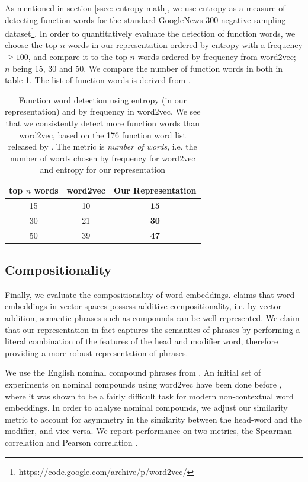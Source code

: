 \documentclass[11pt]{book}
\newcommand{\citep}[1]{\cite{#1}}
\newcommand{\citet}[1]{\cite{#1}}
\begin{document}
As mentioned in section \ref{ssec: entropy math}, we use entropy as a measure
of detecting function words for the standard GoogleNews-300 negative sampling
dataset\footnote{https://code.google.com/archive/p/word2vec/}. In order to
quantitatively evaluate the detection of function words, we choose the top $n$
words in our representation ordered by entropy with a frequency $\geq 100$, and
compare it to the top $n$ words ordered by frequency from word2vec; $n$ being
15, 30 and 50. We compare the number of function words in both in table
\ref{tab: function word eval}. The list of function words is derived from
\citet{nation2016making}.

\begin{table}[]
    \centering
    \begin{tabular}{c|cc}
        top $n$ words & \bf word2vec & \bf Our Representation  \\ \hline
        15  & 10 & \bf 15 \\
        30  & 21 & \bf 30 \\
        50  & 39 & \bf 47  \\
    \end{tabular}
    \caption{Function word detection using entropy (in our representation) and by frequency in word2vec. We see that we consistently detect more function words than word2vec, based on the 176 function word list released by \citet{nation2016making}. The metric is \emph{number of words}, i.e. the number of words chosen by frequency for word2vec and entropy for our representation}
    \label{tab: function word eval}
\end{table}

\subsection{Compositionality}
\label{ssec: entailment}

Finally, we evaluate the compositionality of word embeddings.
\citet{mikolov2013distributed} claims that word embeddings in vector spaces
possess additive compositionality, i.e. by vector addition, semantic phrases
such as compounds can be well represented. We claim that our representation in
fact captures the semantics of phrases by performing a literal combination of
the features of the head and modifier word, therefore providing a more robust
representation of phrases.

We use the English nominal compound phrases from
\citet{ramisch-etal-2016-naked}. An initial set of experiments on nominal
compounds using word2vec have been done before
\citep{cordeiro-etal-2016-predicting}, where it was shown to be a fairly
difficult task for modern non-contextual word embeddings. In order to analyse
nominal compounds, we adjust our similarity metric to account for asymmetry in
the similarity between the head-word and the modifier, and vice versa. We
report performance on two metrics, the Spearman correlation
\citep{spearman1987proof} and Pearson correlation \citep{pearson1920notes}.
\end{document}
